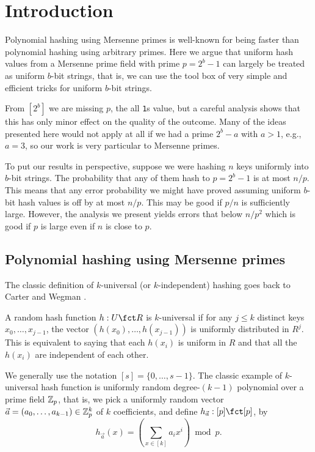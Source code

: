 \section{Introduction}
Polynomial hashing using Mersenne primes is well-known for being faster
than polynomial hashing using arbitrary primes. Here we argue that
uniform hash values from a Mersenne prime field with prime $p=2^b-1$
can largely be treated as uniform $b$-bit strings, that is, we can use
the tool box of very simple and efficient tricks for uniform
$b$-bit strings.

From $[2^b]$ we are missing $p$, the all \texttt1s value, but
a careful analysis shows that this has only minor effect
on the quality of the outcome. Many of the ideas presented
here would not apply at all if we had a prime $2^b-a$ with $a>1$, e.g.,
$a=3$, so our work is very particular to Mersenne primes.

To put our results in perspective, suppose we were hashing $n$ keys uniformly
into $b$-bit strings. The probability that any of them hash
to $p=2^b-1$ is at most $n/p$. This means that any error
probability we might have proved assuming uniform $b$-bit hash
values is off by at most $n/p$. This may be good if $p/n$ is
sufficiently large. However, the analysis we present yields 
errors that below $n/p^2$ which is good if $p$ is large
even if $n$ is close to $p$.

\subsection{Polynomial hashing using Mersenne primes}
The classic definition of $k$-universal (or $k$-independent) hashing
goes back to Carter and Wegman \cite{wegman81kwise}.
\begin{definition}
A random hash function $h:U\fct R$ is $k$-universal if for any $j\leq k$
distinct keys $x_0,\ldots,x_{j-1}$, the vector
$(h(x_0),\ldots,h(x_{j-1}))$ is uniformly distributed in $R^j$. This
is equivalent to saying that each $h(x_i)$ is uniform in $R$ and that
all the $h(x_i)$ are independent of each other.
\end{definition}
We generally use the notation $[s]=\{0,\ldots,s-1\}$.
The classic example of $k$-universal
hash function is uniformly random degree-$(k-1)$ polynomial over a prime field
$\mathbb Z_p$, that is, we pick a uniformly random vector
$\vec a=(a_0,\ldots,a_{k-1})\in \mathbb Z_p^k$ of $k$ coefficients, and define
$h_{\vec a}:[p]\fct[p]$, by 
\[h_{\vec a}(x)=\left(\sum_{x\in[k]}a_i x^i\right)\bmod p.\]

